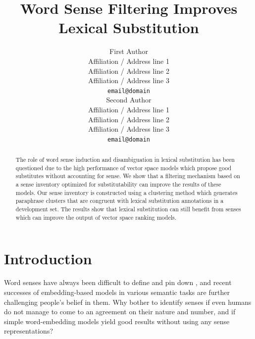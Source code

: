 \documentclass[11pt]{article}
\title{Word Sense Filtering Improves Lexical Substitution} %
\author{First Author \\
  Affiliation / Address line 1 \\
  Affiliation / Address line 2 \\
  Affiliation / Address line 3 \\
  {\tt email@domain} \\\And
  Second Author \\
  Affiliation / Address line 1 \\
  Affiliation / Address line 2 \\
  Affiliation / Address line 3 \\
  {\tt email@domain} \\}
\date{}
\begin{document}
\maketitle
\begin{abstract}

The role of word sense induction and disambiguation in lexical substitution has been questioned due to the high performance of vector space models which propose good substitutes without accounting for sense. We show that a filtering mechanism based on a sense inventory optimized for substitutability can improve the results of these models. Our sense inventory is constructed using a clustering method which generates paraphrase clusters that are congruent with lexical substitution annotations in a development set. The results show that lexical substitution can still benefit from senses which can improve the output of vector space ranking models.

\end{abstract}

\section{Introduction}

Word senses have always been difficult to define and pin down \cite{kilgarriff1997don,erk2009investigations}, and recent successes of embedding-based models in various semantic tasks are further challenging people's belief in them. Why bother to identify senses if even humans do not manage to come to an agreement on their nature and number, and if simple word-embedding models yield good results without using any sense representations? 
\end{document}
